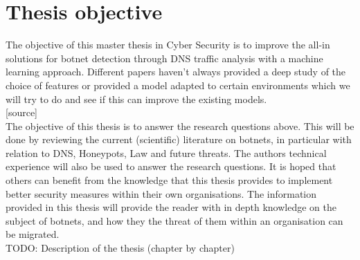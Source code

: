 \section{Thesis objective}
The objective of this master thesis in Cyber Security is to improve the all-in solutions for botnet detection through DNS traffic analysis with a machine learning approach. Different papers haven't always provided a deep study of the choice of features or provided a model adapted to certain environments which we will try to do and see if this can improve the existing models.\\

[source]\\
The objective of this thesis is to answer the research questions above. This will be done by reviewing
the current (scientific) literature on botnets, in particular with relation to DNS, Honeypots,
Law and future threats. The authors technical experience will also be used to answer the research
questions. It is hoped that others can benefit from the knowledge that this thesis provides to implement
better security measures within their own organisations. The information provided in this thesis
will provide the reader with in depth knowledge on the subject of botnets, and how they the threat
of them within an organisation can be migrated.
\\
TODO: Description of the thesis (chapter by chapter)

